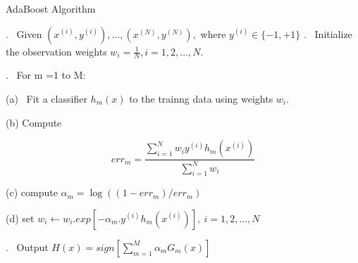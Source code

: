 \documentclass[12pt]{article}
\begin{document}
 
 \begin{algorithm}
 	
 	\caption*{AdaBoost Algorithm} \label{alg:MyAlgorithm}
 	\begin{algorithmic}
 		
 		. \ Given $(x^{(i)},y^{(i)}),...,(x^{(N)},y^{(N)}),$ where $y^{(i)}\in \{-1,+1\}$ 
 		. \  Initialize the observation weights $w_{i}= \frac{1}{N},i = 1,2,...,N.$
 		
 		. \ For m =1 to M:
 		
 		
 		
 		\STATE \hspace{ 0.8cm}(a) \ Fit a classifier $h_{m}(x)$ to the trainng data using weights $w_{i}.$
 		
 		\STATE \hspace{ 0.8cm}(b) Compute 
 		
 	
 		
 			$$err_{m} = \frac{\sum_{i=1}^{N}w_{i}y^{(i)}h_{m}(x^{(i)})}{\sum_{i=1}^{N} w_{i}}$$
 		
 		
 		
 			\STATE \hspace{ 0.8cm}(c) compute $\alpha_{m} = \log((1-err_{m})/err_{m})$
 			
 				\STATE \hspace{ 0.8cm}(d) set $w_{i} \leftarrow w_{i}.exp[-\alpha_{m}.y^{(i)}h_{m}(x^{(i)})], \ i = 1,2,...,N$
 				
 	. \ Output $H(x) = sign[\sum_{m=1}^{M}\alpha_{m}G_{m}(x)]$
 		
 		
 	\end{algorithmic}
 \end{algorithm}
 
 
 
 
 
 
 
 
 
 
 
 
 
 
 
 
 
 
\end{document}
